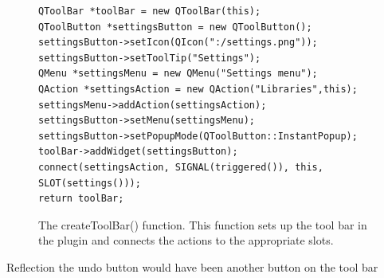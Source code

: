 \begin{figure}[h] %
\centering
\lstset{language=C++} 
\begin{lstlisting}[frame=single]  
QToolBar *toolBar = new QToolBar(this);
QToolButton *settingsButton = new QToolButton();
settingsButton->setIcon(QIcon(":/settings.png"));
settingsButton->setToolTip("Settings");
QMenu *settingsMenu = new QMenu("Settings menu");
QAction *settingsAction = new QAction("Libraries",this);
settingsMenu->addAction(settingsAction);
settingsButton->setMenu(settingsMenu);
settingsButton->setPopupMode(QToolButton::InstantPopup);
toolBar->addWidget(settingsButton);
connect(settingsAction, SIGNAL(triggered()), this, SLOT(settings()));
return toolBar;
\end{lstlisting}
\caption{The createToolBar() function. This function sets up the tool bar in the plugin and connects the actions to the appropriate slots.}
\label{fig:settingsToolBarCode} 	
\end{figure}

Reflection
the undo button would have been another button on the tool bar

